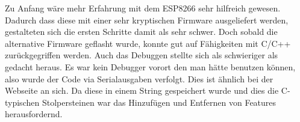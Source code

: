 Zu Anfang wäre mehr Erfahrung mit dem ESP8266 sehr hilfreich gewesen.
Dadurch dass diese mit einer sehr kryptischen Firmware ausgeliefert werden,
gestalteten sich die ersten Schritte damit als sehr schwer. Doch sobald die alternative
Firmware geflasht wurde, konnte gut auf Fähigkeiten mit C/C++ zurückgegriffen werden.
Auch das Debuggen stellte sich als schwieriger als gedacht heraus. Es war kein Debugger
vorort den man hätte benutzen können, also wurde der Code via Serialausgaben verfolgt.
Dies ist ähnlich bei der Webseite an sich. Da diese in einem String gespeichert wurde und
dies die C-typischen Stolpersteinen war das Hinzufügen und Entfernen von Features herausfordernd.
